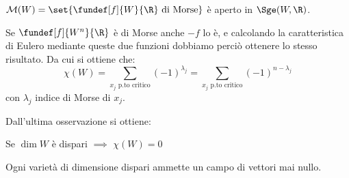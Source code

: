 \begin{teo}
$\mathcal{M}(W) = \set{\fundef[f]{W}{\R}~\text{di Morse}}$ è aperto in $\Sge(W,\R)$.
\end{teo}

\begin{oss}
Se $\fundef[f]{W^n}{\R}$ è di Morse anche $-f$ lo è, e calcolando la caratteristica di Eulero mediante queste due funzioni dobbiamo perciò ottenere lo stesso risultato. Da cui si ottiene che:
\begin{equation*}
\chi(W) = \sum_\text{$x_j$~p.to~critico} (-1)^{\lambda _j} = \sum_\text{$x_j$~p.to~critico} (-1)^{n - \lambda _j} 
\end{equation*}
con $\lambda _j$ indice di Morse di $x_j$.
\end{oss}

Dall'ultima osservazione si ottiene:
\begin{prop}
Se $\dim W$ è dispari $\implies$ $\chi(W) = 0$
\end{prop}

\begin{cor}
Ogni varietà di dimensione dispari ammette un campo di vettori mai nullo.
\end{cor}
